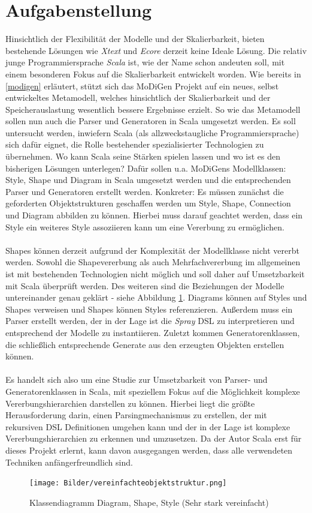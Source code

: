 \section{Aufgabenstellung}
Hinsichtlich der Flexibilität der Modelle und der Skalierbarkeit, bieten bestehende Lösungen wie \textit{Xtext} und \textit{Ecore} derzeit keine Ideale Lösung. Die relativ junge Programmiersprache \textit{Scala} ist, wie der Name schon andeuten soll, mit einem besonderen Fokus auf die Skalierbarkeit entwickelt worden. Wie bereits in \ref{modigen} erläutert, stützt sich das MoDiGen Projekt auf ein neues, selbst entwickeltes Metamodell, welches hinsichtlich der Skalierbarkeit und der Speicherauslastung wesentlich bessere Ergebnisse erzielt. So wie das Metamodell sollen nun auch die Parser und Generatoren in Scala umgesetzt werden. Es soll untersucht werden, inwiefern Scala (als allzweckstaugliche Programmiersprache) sich dafür eignet, die Rolle bestehender spezialisierter Technologien zu übernehmen. Wo kann Scala seine Stärken spielen lassen und wo ist es den bisherigen Lösungen unterlegen? Dafür sollen u.a. MoDiGens Modellklassen: Style, Shape und Diagram in Scala umgesetzt werden und die entsprechenden Parser und Generatoren erstellt werden. Konkreter: Es müssen zunächst die geforderten Objektstrukturen geschaffen werden um Style, Shape, Connection und Diagram abbilden zu können. Hierbei muss darauf geachtet werden, dass ein Style ein weiteres Style assoziieren kann um eine Vererbung zu ermöglichen.\\\\Shapes können derzeit aufgrund der Komplexität der Modellklasse nicht vererbt werden. Sowohl die Shapevererbung als auch Mehrfachvererbung im allgemeinen ist mit bestehenden Technologien nicht möglich und soll daher auf Umsetzbarkeit mit Scala überprüft werden. Des weiteren sind die Beziehungen der Modelle untereinander genau geklärt - siehe Abbildung \ref{diagramshapestyle}. Diagrams können auf Styles und Shapes verweisen und Shapes können Styles referenzieren. Außerdem muss ein Parser erstellt werden, der in der Lage ist die \textit{Spray} DSL zu interpretieren und entsprechend der Modelle zu instantiieren. Zuletzt kommen Generatorenklassen, die schließlich entsprechende Generate aus den erzeugten Objekten erstellen können.\\\\Es handelt sich also um eine Studie zur Umsetzbarkeit von Parser- und Generatorenklassen in Scala, mit speziellem Fokus auf die Möglichkeit komplexe Vererbungshierarchien darstellen zu können. Hierbei liegt die größte Herausforderung darin, einen Parsingmechanismus zu erstellen, der mit rekursiven DSL Definitionen umgehen kann und der in der Lage ist komplexe Vererbungshierarchien zu erkennen und umzusetzen. Da der Autor Scala erst für dieses Projekt erlernt, kann davon ausgegangen werden, dass alle verwendeten Techniken anfängerfreundlich sind.
\begin{figure}[h]
\begin{center}
\texttt{[image: Bilder/vereinfachteobjektstruktur.png]}
\caption{Klassendiagramm Diagram, Shape, Style (Sehr stark vereinfacht)}
\label{diagramshapestyle}
\end{center}
\end{figure}